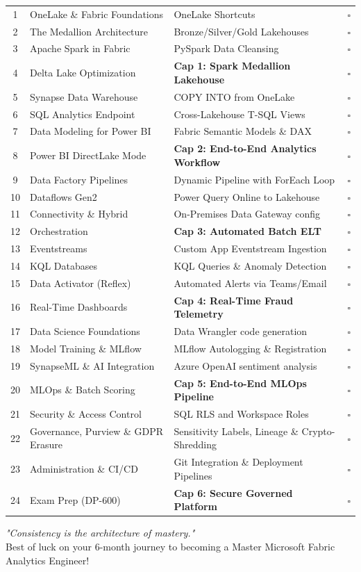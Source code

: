 \documentclass[11pt, a4paper]{article}
\begin{document}
\begin{center}
\begin{longtable}{@{} c l p{7cm} c @{}}
1 & OneLake \& Fabric Foundations & OneLake Shortcuts & $\square$ \\
2 & The Medallion Architecture & Bronze/Silver/Gold Lakehouses & $\square$ \\
3 & Apache Spark in Fabric & PySpark Data Cleansing & $\square$ \\
4 & Delta Lake Optimization & \textbf{Cap 1: Spark Medallion Lakehouse} & $\square$ \\
\midrule
5 & Synapse Data Warehouse & COPY INTO from OneLake & $\square$ \\
6 & SQL Analytics Endpoint & Cross-Lakehouse T-SQL Views & $\square$ \\
7 & Data Modeling for Power BI & Fabric Semantic Models \& DAX & $\square$ \\
8 & Power BI DirectLake Mode & \textbf{Cap 2: End-to-End Analytics Workflow} & $\square$ \\
\midrule
9 & Data Factory Pipelines & Dynamic Pipeline with ForEach Loop & $\square$ \\
10 & Dataflows Gen2 & Power Query Online to Lakehouse & $\square$ \\
11 & Connectivity \& Hybrid & On-Premises Data Gateway config & $\square$ \\
12 & Orchestration & \textbf{Cap 3: Automated Batch ELT} & $\square$ \\
\midrule
13 & Eventstreams & Custom App Eventstream Ingestion & $\square$ \\
14 & KQL Databases & KQL Queries \& Anomaly Detection & $\square$ \\
15 & Data Activator (Reflex) & Automated Alerts via Teams/Email & $\square$ \\
16 & Real-Time Dashboards & \textbf{Cap 4: Real-Time Fraud Telemetry} & $\square$ \\
\midrule
17 & Data Science Foundations & Data Wrangler code generation & $\square$ \\
18 & Model Training \& MLflow & MLflow Autologging \& Registration & $\square$ \\
19 & SynapseML \& AI Integration & Azure OpenAI sentiment analysis & $\square$ \\
20 & MLOps \& Batch Scoring & \textbf{Cap 5: End-to-End MLOps Pipeline} & $\square$ \\
\midrule
21 & Security \& Access Control & SQL RLS and Workspace Roles & $\square$ \\
22 & Governance, Purview \& GDPR Erasure & Sensitivity Labels, Lineage \& Crypto-Shredding & $\square$ \\
23 & Administration \& CI/CD & Git Integration \& Deployment Pipelines & $\square$ \\
24 & Exam Prep (DP-600) & \textbf{Cap 6: Secure Governed Platform} & $\square$ \\

\end{longtable}
\end{center}

\vspace{1cm}
\begin{center}
    \textit{"Consistency is the architecture of mastery."} \\
    Best of luck on your 6-month journey to becoming a Master Microsoft Fabric Analytics Engineer!
\end{center}
\end{document}
